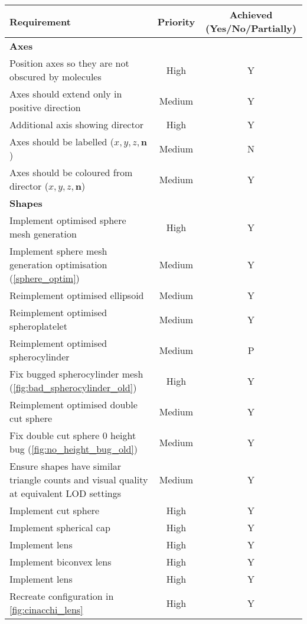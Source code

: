 \begin{table}
  \begin{center}
  \begin{adjustbox}{width=\textwidth}
    \begin{tabular}{lcc}
    \hline\hline
       \textbf{Requirement} & \textbf{Priority} & \textbf{Achieved (Yes/No/Partially)} \\
       \hline
       \textbf{Axes} & &\\
       \hline
       Position axes so they are not obscured by molecules & High & Y\\
       Axes should extend only in positive direction & Medium & Y\\
       Additional axis showing director & High & Y\\
       Axes should be labelled ($x,y,z,\mathbf{n}$)& Medium & N\\
       Axes should be coloured from director ($x,y,z,\mathbf{n}$)& Medium & Y\\
        \hline
       \textbf{Shapes} & &\\
       \hline
       Implement optimised sphere mesh generation & High & Y\\
       Implement sphere mesh generation optimisation (\cref{sphere_optim}) & Medium & Y\\
       Reimplement optimised ellipsoid & Medium & Y\\
       Reimplement optimised spheroplatelet & Medium & Y\\
       Reimplement optimised spherocylinder & Medium & P\\
       Fix bugged spherocylinder mesh (\cref{fig:bad_spherocylinder_old}) & High & Y\\
       Reimplement optimised double cut sphere & Medium & Y\\
       Fix double cut sphere 0 height bug (\cref{fig:no_height_bug_old}) & Medium & Y\\
       Ensure shapes have similar triangle counts and visual quality at equivalent LOD settings & Medium & Y\\
       Implement cut sphere & High & Y\\
       Implement spherical cap & High & Y\\
       Implement lens & High & Y\\
       Implement biconvex lens & High & Y\\
       Implement lens & High & Y\\
       Recreate configuration in \cref{fig:cinacchi_lens} & High & Y\\

\end{tabular}
\end{adjustbox}
\end{center}
\end{table}
